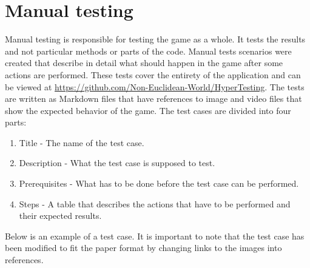 \section{Manual testing} \label{sec:manual_testing}
Manual testing is responsible for testing the game as a whole.
It tests the results and not particular methods or parts of the code.
Manual tests scenarios were created that describe in detail what should happen in the game after some actions are performed.
These tests cover the entirety of the application and can be viewed at \url{https://github.com/Non-Euclidean-World/HyperTesting}.
The tests are written as Markdown files that have references to image and video files that show the expected behavior of the game.
The test cases are divided into four parts:
\begin{enumerate}
  \item Title - The name of the test case.
  \item Description - What the test case is supposed to test.
  \item Prerequisites - What has to be done before the test case can be performed.
  \item Steps - A table that describes the actions that have to be performed and their expected results.
\end{enumerate}

Below is an example of a test case. 
It is important to note that the test case has been modified to fit the paper format by changing links to the images into references.


